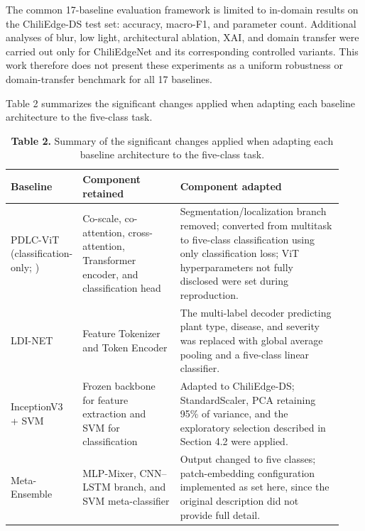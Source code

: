 The common 17-baseline evaluation framework is limited to in-domain results on the ChiliEdge-DS test set: accuracy, macro-F1, and parameter count. Additional analyses of blur, low light, architectural ablation, XAI, and domain transfer were carried out only for ChiliEdgeNet and its corresponding controlled variants. This work therefore does not present these experiments as a uniform robustness or domain-transfer benchmark for all 17 baselines.

Table 2 summarizes the significant changes applied when adapting each baseline architecture to the five-class task.

\begin{table}[!tb]
\centering
\caption*{\textbf{Table 2.} Summary of the significant changes applied when adapting each baseline architecture to the five-class task.}
\label{tab:2}
\footnotesize
\renewcommand{\arraystretch}{1.3}
\begin{tabular}{>{\raggedright\arraybackslash}p{0.13\linewidth} >{\raggedright\arraybackslash}p{0.30\linewidth} >{\raggedright\arraybackslash}p{0.50\linewidth}}
\toprule
\textbf{Baseline} & \textbf{Component retained} & \textbf{Component adapted} \\
\midrule
PDLC-ViT (classification-only; \cite{hemalatha2024}) & Co-scale, co-attention, cross-attention, Transformer encoder, and classification head & Segmentation/localization branch removed; converted from multitask to five-class classification using only classification loss; ViT hyperparameters not fully disclosed were set during reproduction. \\
LDI-NET \cite{yangB2024} & Feature Tokenizer and Token Encoder & The multi-label decoder predicting plant type, disease, and severity was replaced with global average pooling and a five-class linear classifier. \\
InceptionV3 + SVM \cite{sujatha2025} & Frozen backbone for feature extraction and SVM for classification & Adapted to ChiliEdge-DS; StandardScaler, PCA retaining 95\% of variance, and the exploratory selection described in Section 4.2 were applied. \\
Meta-Ensemble \cite{maurya2024} & MLP-Mixer, CNN--LSTM branch, and SVM meta-classifier & Output changed to five classes; patch-embedding configuration implemented as set here, since the original description did not provide full detail. \\
\bottomrule
\end{tabular}
\end{table}

